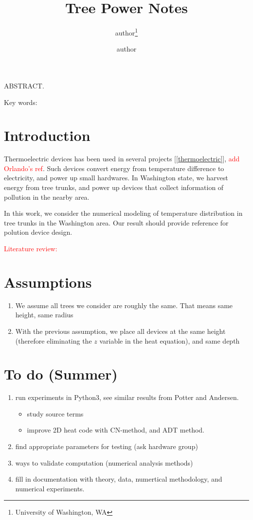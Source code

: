 \documentclass[12pt]{article}
\title{Tree Power Notes}
\author{author\thanks{University of Washington, WA} %
\and author\footnotemark[1]}
\begin{document}
\maketitle

\noindent ABSTRACT. 

\vspace{1cm}

\noindent Key words: 


\section*{Introduction}  
Thermoelectric devices has been used in several projects [\ref{thermoelectric}], \textcolor{red}{add Orlando's ref}. Such devices convert energy from temperature difference to electricity, and power up small hardwares. In Washington state, we harvest energy from tree trunks, and power up devices that collect information of pollution in the nearby area.

In this work, we consider the numerical modeling of temperature distribution in tree trunks in the Washington area. Our result should provide reference for polution device design. 

\textcolor{red}{Literature review:}



\section{Assumptions}

\begin{enumerate}
\item We assume all trees we consider are roughly the same. That means same height, same radius
\item With the previous assumption, we place all devices at the same height (therefore eliminating the $z$ variable in the heat equation), and same depth
\end{enumerate}

\section{To do (Summer)}
\begin{enumerate}
\item run experiments in Python3, see similar results from Potter and Andersen. 
\begin{itemize}
\item study source terms
\item improve 2D heat code with CN-method, and ADT method.
\end{itemize}
\item find appropriate parameters for testing (ask hardware group)
\item ways to validate computation (numerical analysis methods)
\item fill in documentation with theory, data, numertical methodology, and numerical experiments. 
\end{enumerate}
\end{document}
